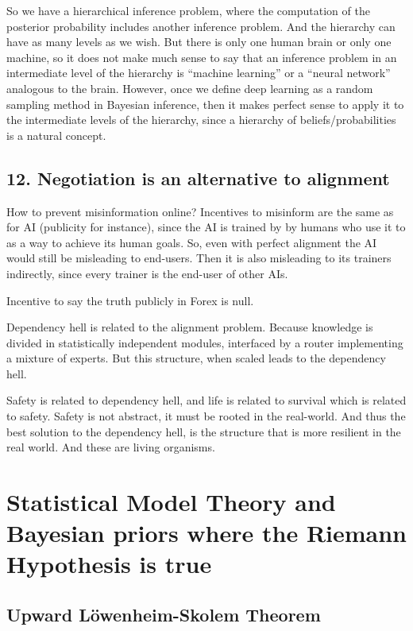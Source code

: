 \documentclass[11pt]{book}
\begin{document}
So we have a hierarchical inference problem, where the computation of
the posterior probability includes another inference problem. And the
hierarchy can have as many levels as we wish. But there is only one
human brain or only one machine, so it does not make much sense to say
that an inference problem in an intermediate level of the hierarchy is
``machine learning'' or a ``neural network'' analogous to the brain.
However, once we define deep learning as a random sampling method in
Bayesian inference, then it makes perfect sense to apply it to the
intermediate levels of the hierarchy, since a hierarchy of
beliefs/probabilities is a natural concept.

\hypertarget{negotiation-is-an-alternative-to-alignment}{%
\section{12. Negotiation is an alternative to
alignment}\label{negotiation-is-an-alternative-to-alignment}}

How to prevent misinformation online? Incentives to misinform are the
same as for AI (publicity for instance), since the AI is trained by by
humans who use it to as a way to achieve its human goals. So, even with
perfect alignment the AI would still be misleading to end-users. Then it
is also misleading to its trainers indirectly, since every trainer is
the end-user of other AIs.

Incentive to say the truth publicly in Forex is null.

Dependency hell is related to the alignment problem. Because knowledge
is divided in statistically independent modules, interfaced by a router
implementing a mixture of experts. But this structure, when scaled leads
to the dependency hell.

Safety is related to dependency hell, and life is related to survival
which is related to safety. Safety is not abstract, it must be rooted in
the real-world. And thus the best solution to the dependency hell, is
the structure that is more resilient in the real world. And these are
living organisms.

\chapter{Statistical Model Theory and Bayesian priors where the Riemann Hypothesis is true}
\hypertarget{upward-lwenheim-skolem-theorem}{%
\section{\texorpdfstring{\textbf{Upward Löwenheim-Skolem
Theorem}}{Upward Löwenheim-Skolem Theorem}}\label{upward-lwenheim-skolem-theorem}}
\end{document}
